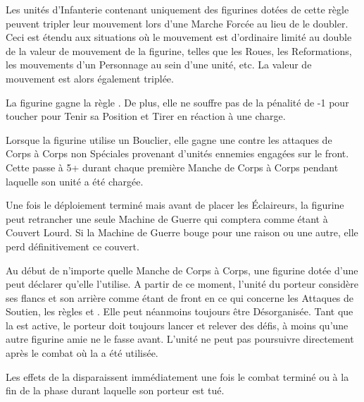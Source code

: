 \closearmywiderules



\vspace*{1.5cm}
\startarmyspecialrules

\armyspecialruleentry{\relentless}

Les unités d'Infanterie contenant uniquement des figurines dotées de cette règle peuvent tripler leur mouvement lors d'une Marche Forcée au lieu de le doubler. Ceci est étendu aux situations où le mouvement est d'ordinaire limité au double de la valeur de mouvement de la figurine, telles que les Roues, les Reformations, les mouvements d'un Personnage au sein d'une unité, etc. La valeur de mouvement est alors également triplée.

\armyspecialruleentry{\sturdy}

La figurine gagne la règle \thunderouscharge{}. De plus, elle ne souffre pas de la pénalité de -1 pour toucher pour Tenir sa Position et Tirer en réaction à une charge. 

\armyspecialruleentry{\shieldwall}

Lorsque la figurine utilise un Bouclier, elle gagne une  contre les attaques de Corps à Corps non Spéciales provenant d'unités ennemies engagées sur le front. Cette \wardsave{} passe à 5+ durant chaque première Manche de Corps à Corps pendant laquelle son unité a été chargée. 

\armyspecialruleentry{\entrench}

Une fois le déploiement terminé mais avant de placer les Éclaireurs, la figurine peut retrancher une seule Machine de Guerre qui comptera comme étant à Couvert Lourd. Si la Machine de Guerre bouge pour une raison ou une autre, elle perd définitivement ce couvert.

\armyspecialruleentry{\holdstone}

Au début de n'importe quelle Manche de Corps à Corps, une figurine dotée d'une \holdstone{} peut déclarer qu'elle l'utilise. A partir de ce moment, l'unité du porteur considère ses flancs et son arrière comme étant de front en ce qui concerne les Attaques de Soutien, les règles \parry{} et \shieldwall{}. Elle peut néanmoins toujours être Désorganisée. Tant que la \holdstone{} est active, le porteur doit toujours lancer et relever des défis, à moins qu'une autre figurine amie ne le fasse avant. L'unité ne peut pas poursuivre directement après le combat où la \holdstone{} a été utilisée.

Les effets de la \holdstone{} disparaissent immédiatement une fois le combat terminé ou à la fin de la phase durant laquelle son porteur est tué.

